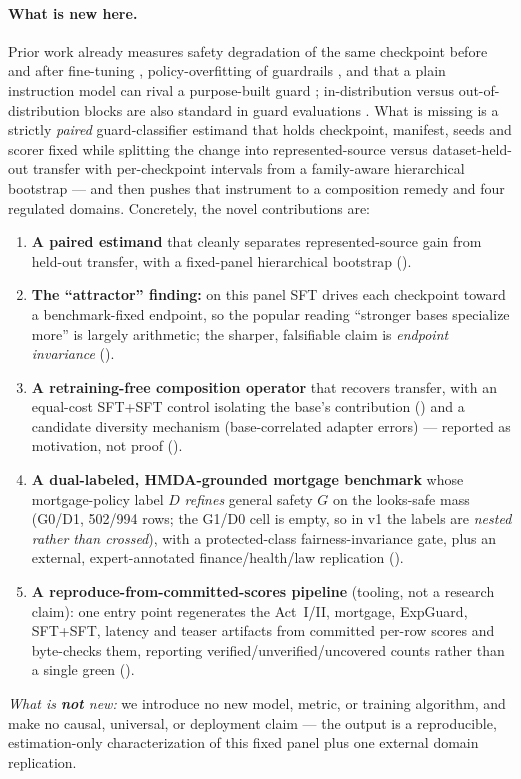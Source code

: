 \documentclass[11pt]{article}
\begin{document}
\paragraph{What is new here.} Prior work already measures safety degradation of the same checkpoint
before and after fine-tuning \citep{hsiung2025guardrails}, policy-overfitting of guardrails
\citep{liu2026domaingeneralizable}, and that a plain instruction model can rival a purpose-built guard
\citep{bassani2024guardbench}; in-distribution versus out-of-distribution blocks are also standard in
guard evaluations \citep{inan2023llamaguard,han2024wildguard,elesedy2024loraguard}. What is missing is a
strictly \emph{paired} guard-classifier estimand that holds checkpoint, manifest, seeds and scorer fixed
while splitting the change into represented-source versus dataset-held-out transfer with per-checkpoint
intervals from a family-aware hierarchical bootstrap --- and then pushes that instrument to a composition
remedy and four regulated domains. Concretely, the novel contributions are:
\begin{enumerate}[leftmargin=1.7em,itemsep=1pt]
  \item \textbf{A paired estimand} that cleanly separates represented-source gain from held-out transfer,
  with a fixed-panel hierarchical bootstrap ().
  \item \textbf{The ``attractor'' finding:} on this panel SFT drives each checkpoint toward a benchmark-fixed
  endpoint, so the popular reading ``stronger bases specialize more'' is largely arithmetic; the sharper,
  falsifiable claim is \emph{endpoint invariance} ().
  \item \textbf{A retraining-free composition operator} that recovers transfer, with an equal-cost SFT+SFT
  control isolating the base's contribution () and a candidate diversity mechanism
  (base-correlated adapter errors) --- reported as motivation, not proof ().
  \item \textbf{A dual-labeled, HMDA-grounded mortgage benchmark} whose mortgage-policy label $D$
  \emph{refines} general safety $G$ on the looks-safe mass (G0/D1, 502/994 rows; the G1/D0 cell is empty,
  so in v1 the labels are \emph{nested rather than crossed}), with a protected-class
  fairness-invariance gate, plus an external, expert-annotated finance/health/law replication
  ().
  \item \textbf{A reproduce-from-committed-scores pipeline} (tooling, not a research claim): one entry
  point regenerates the Act~I/II, mortgage, ExpGuard, SFT+SFT, latency and teaser artifacts from committed
  per-row scores and byte-checks them, reporting verified/unverified/uncovered counts rather than a single
  green ().
\end{enumerate}
\emph{What is \textbf{not} new:} we introduce no new model, metric, or training algorithm, and make no
causal, universal, or deployment claim --- the output is a reproducible, estimation-only characterization
of this fixed panel plus one external domain replication.
\end{document}

